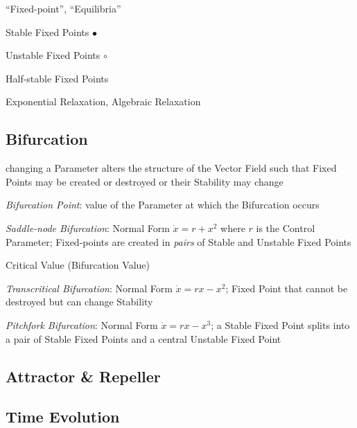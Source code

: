 ``Fixed-point'', ``Equilibria'' %

Stable Fixed Points $\bullet$

Unstable Fixed Points $\circ$

Half-stable Fixed Points

Exponential Relaxation, Algebraic Relaxation



\subsection{Bifurcation}\label{sec:bifurcation}

changing a Parameter alters the structure of the Vector Field such that Fixed
Points may be created or destroyed or their Stability may change

\emph{Bifurcation Point}: value of the Parameter at which the Bifurcation
occurs

\emph{Saddle-node Bifurcation}: Normal Form $\dot{x} = r + x^2$ where $r$ is
the Control Parameter;
Fixed-points are created in \emph{pairs} of Stable and Unstable Fixed Points


Critical Value (Bifurcation Value)

\emph{Transcritical Bifurcation}: Normal Form $\dot{x} = rx - x^2$; Fixed Point
that cannot be destroyed but can change Stability

\emph{Pitchfork Bifurcation}: Normal Form $\dot{x} = rx - x^3$; a Stable Fixed
Point splits into a pair of Stable Fixed Points and a central Unstable Fixed
Point



\subsection{Attractor \& Repeller}\label{sec:attractor_repeller}

\subsection{Time Evolution}\label{sec:time_evolution}

